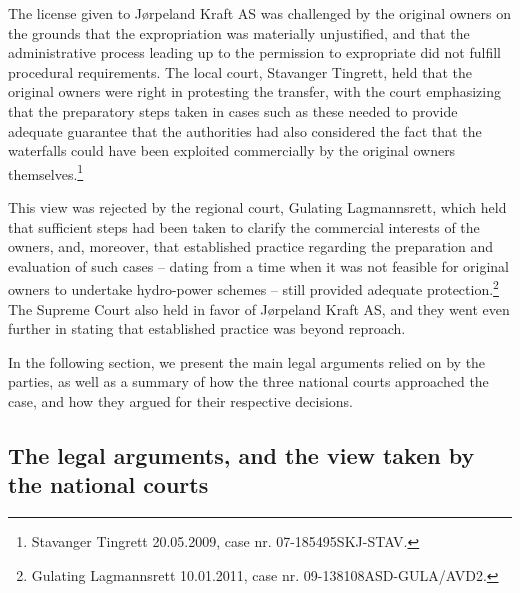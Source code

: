 The license given to Jørpeland Kraft AS was challenged by the original owners on the grounds that the expropriation was materially unjustified, and that the administrative process leading up to the permission to expropriate did not fulfill procedural requirements. The local court, Stavanger Tingrett, held that the original owners were right in protesting the transfer, with the court emphasizing that the preparatory steps taken in cases such as these needed to provide adequate guarantee that the authorities had also considered the fact that the waterfalls could have been exploited commercially by the original owners themselves.\footnote{Stavanger Tingrett 20.05.2009, case nr. 07-185495SKJ-STAV.}

This view was rejected by the regional court, Gulating Lagmannsrett, which held that sufficient steps had been taken to clarify the commercial interests of the owners, and, moreover, that established practice regarding the preparation and evaluation of such cases -- dating from a time when it was not feasible for original owners to undertake hydro-power schemes -- still provided adequate protection.\footnote{Gulating Lagmannsrett 10.01.2011, case nr. 09-138108ASD-GULA/AVD2.} The Supreme Court also held in favor of Jørpeland Kraft AS, and they went even further in stating that established practice was beyond reproach.

In the following section, we present the main legal arguments relied on by the parties, as well as a summary of how the three national courts approached the case, and how they argued for their respective decisions.

\subsection{The legal arguments, and the view taken by the national courts}\label{view}

